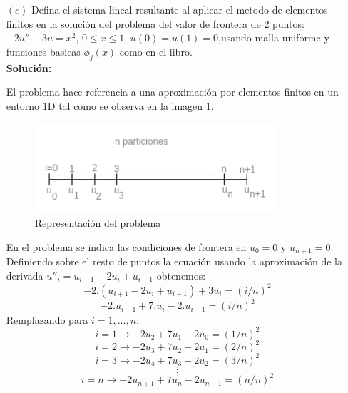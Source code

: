\begin{itemize}
\item[$(c)$] Defina el sistema lineal resultante al aplicar el metodo de elementos finitos en la solución del problema del valor de frontera de 2 puntos: $-2u''+3u=x^2$, $0\leq x\leq 1$, $u(0)=u(1)=0$,usando malla uniforme y funciones basicas $\phi_j(x)$ como en el libro.\\

\textbf{\underline{Solución:}}

El problema hace referencia a una aproximación por elementos finitos en un entorno 1D tal como se observa en la imagen \ref{2p_mef}.
%
\begin{figure}[H]
	\centering
	\includegraphics[scale=0.6]{images/2p_bound.png}
	\caption{Representación del problema}
	\label{2p_mef}
\end{figure}
En el problema se indica las condiciones de frontera en $u_0=0$ y $u_{n+1}=0$. Definiendo sobre el resto de puntos la ecuación usando la aproximación de la derivada  $u''_i=u_{i+1}-2u_i+u_{i-1}$ obtenemos:\\
$$-2.(u_{i+1}-2u_i+u_{i-1})+3u_i=(i/n)^2$$
$$-2.u_{i+1}+7.u_i-2.u_{i-1}=(i/n)^2$$
Remplazando para $i=1,\dots,n$:
$$i=1\to -2u_2+7u_1-2u_0=(1/n)^2$$
$$i=2\to -2u_3+7u_2-2u_1=(2/n)^2$$
$$i=3\to -2u_4+7u_3-2u_2=(3/n)^2$$
$$\vdots$$
$$i=n\to -2u_{n+1}+7u_n-2u_{n-1}=(n/n)^2$$


\end{itemize}
